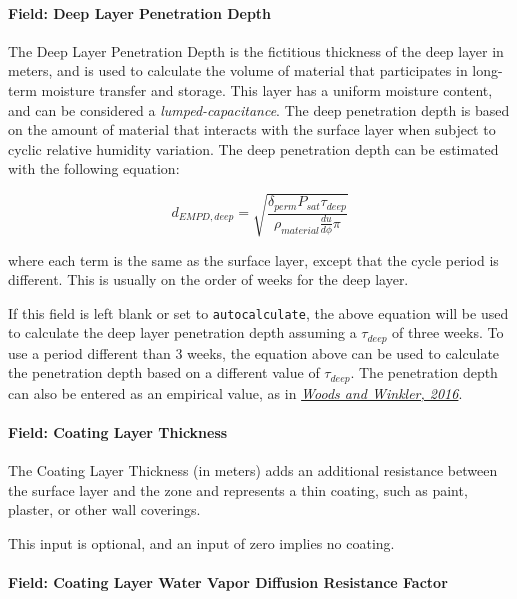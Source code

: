 \paragraph{Field: Deep Layer Penetration
	Depth}\label{field-deep-layer-penetration-depth}

The Deep Layer Penetration Depth is the fictitious thickness of the deep
layer in meters, and is used to calculate the volume of material that
participates in long-term moisture transfer and storage. This layer has
a uniform moisture content, and can be considered a
\emph{lumped-capacitance}. The deep penetration depth is based on the
amount of material that interacts with the surface layer when subject to
cyclic relative humidity variation. The deep penetration depth can be
estimated with the following equation:

\[ d_{EMPD,deep} = \sqrt{\frac{\delta_{perm} P_{sat} \tau_{deep}} {\rho_{material} \frac{du}{d\phi} \pi}} \]

where each term is the same as the surface layer, except that the cycle
period is different. This is usually on the order of weeks for the deep
layer.

If this field is left blank or set to \texttt{autocalculate},
the above equation will be used to calculate the deep layer penetration depth
assuming a $\tau_{deep}$ of three weeks. To use a period different than 3 weeks, the equation above can be used to calculate the penetration depth based on a different value of $\tau_{deep}$. The penetration depth can also be entered as an empirical value, as in \href{http://dx.doi.org/10.1016/j.enbuild.2016.02.008}{\emph{Woods and Winkler, 2016}}.


\paragraph{Field: Coating Layer
	Thickness}\label{field-coating-layer-thickness}

The Coating Layer Thickness (in meters) adds an additional resistance
between the surface layer and the zone and represents a thin coating,
such as paint, plaster, or other wall coverings.

This input is optional, and an input of zero implies no coating.

\paragraph{Field: Coating Layer Water Vapor Diffusion Resistance
	Factor}\label{field-coating-layer-water-vapor-diffusion-resistance-factor}

